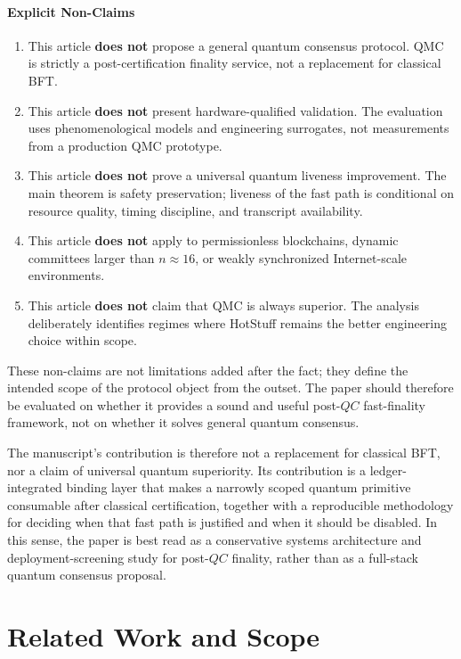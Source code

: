 \documentclass{ieeeaccess}
\begin{document}
\paragraph{Explicit Non-Claims}
\begin{enumerate}
    \item This article \textbf{does not} propose a general quantum consensus protocol. QMC is strictly a post-certification finality service, not a replacement for classical BFT.
    \item This article \textbf{does not} present hardware-qualified validation. The evaluation uses phenomenological models and engineering surrogates, not measurements from a production QMC prototype.
    \item This article \textbf{does not} prove a universal quantum liveness improvement. The main theorem is safety preservation; liveness of the fast path is conditional on resource quality, timing discipline, and transcript availability.
    \item This article \textbf{does not} apply to permissionless blockchains, dynamic committees larger than $n \approx 16$, or weakly synchronized Internet-scale environments.
    \item This article \textbf{does not} claim that QMC is always superior. The analysis deliberately identifies regimes where HotStuff remains the better engineering choice within scope.
\end{enumerate}
These non-claims are not limitations added after the fact; they define the intended scope of the protocol object from the outset. The paper should therefore be evaluated on whether it provides a sound and useful post-$QC$ fast-finality framework, not on whether it solves general quantum consensus.

The manuscript's contribution is therefore not a replacement for classical BFT, nor a claim of universal quantum superiority. Its contribution is a ledger-integrated binding layer that makes a narrowly scoped quantum primitive consumable after classical certification, together with a reproducible methodology for deciding when that fast path is justified and when it should be disabled. In this sense, the paper is best read as a conservative systems architecture and deployment-screening study for post-$QC$ finality, rather than as a full-stack quantum consensus proposal.


\section{Related Work and Scope}
\end{document}
